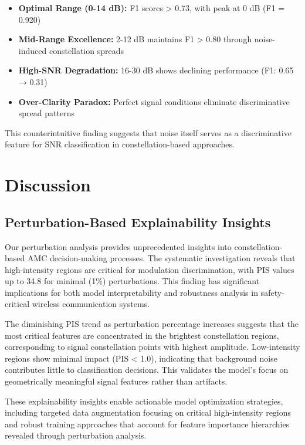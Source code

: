 \documentclass{ELSP}
\begin{document}
{{\begin{itemize}
    \item \textbf{Optimal Range (0-14 dB):} F1 scores > 0.73, with peak at 0 dB (F1 = 0.920)
    \item \textbf{Mid-Range Excellence:} 2-12 dB maintains F1 > 0.80 through noise-induced constellation spreads
    \item \textbf{High-SNR Degradation:} 16-30 dB shows declining performance (F1: 0.65 → 0.31)
    \item \textbf{Over-Clarity Paradox:} Perfect signal conditions eliminate discriminative spread patterns
\end{itemize}

This counterintuitive finding suggests that noise itself serves as a discriminative feature for SNR classification in constellation-based approaches.

\section{Discussion}

\subsection{Perturbation-Based Explainability Insights}

Our perturbation analysis provides unprecedented insights into constellation-based AMC decision-making processes. The systematic investigation reveals that high-intensity regions are critical for modulation discrimination, with PIS values up to 34.8 for minimal (1\%) perturbations. This finding has significant implications for both model interpretability and robustness analysis in safety-critical wireless communication systems.

The diminishing PIS trend as perturbation percentage increases suggests that the most critical features are concentrated in the brightest constellation regions, corresponding to signal constellation points with highest amplitude. Low-intensity regions show minimal impact (PIS < 1.0), indicating that background noise contributes little to classification decisions. This validates the model's focus on geometrically meaningful signal features rather than artifacts.

These explainability insights enable actionable model optimization strategies, including targeted data augmentation focusing on critical high-intensity regions and robust training approaches that account for feature importance hierarchies revealed through perturbation analysis.

}}
\end{document}
